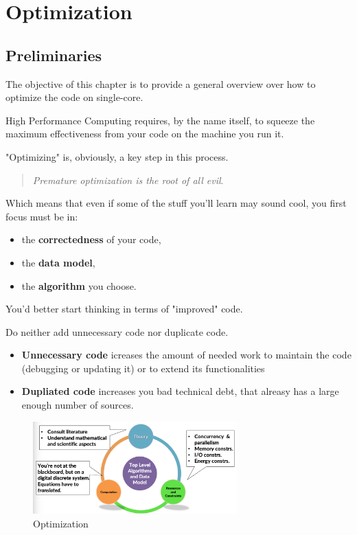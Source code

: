 
\chapter{Optimization}

\section{Preliminaries}

The objective of this chapter is to provide a general overview over how to optimize the code on single-core. 

High Performance Computing requires, by the name itself, to squeeze the
maximum effectiveness from your code on the machine you run it.

"Optimizing" is, obviously, a key step in this process.

\begin{observationblock}[Optimization]
    \vspace{0.3cm}
    \begin{quote}
    \textit{Premature optimization is the root of all evil}.
    \end{quote}
    \vspace{0.3cm}
    Which means that even if some of the stuff you'll learn may sound cool, you first focus must be in:
    \begin{itemize}
        \item the \textbf{correctedness} of your code,
        \item the \textbf{data model},
        \item the \textbf{algorithm} you choose.
    \end{itemize}

    You'd better start thinking in terms of "improved" code. 
\end{observationblock}

Do neither add unnecessary code nor duplicate code. 
\begin{itemize}
    \item \textbf{Unnecessary code} icreases the amount of needed work to maintain the code (debugging or updating it) or to extend its functionalities
    \item \textbf{Dupliated code} increases you bad technical debt, that alreasy has a large enough number of sources.
\end{itemize}

\begin{figure}[H]
    \centering
    \includegraphics[width=0.7\textwidth]{assets/opt1.png}
    \caption{Optimization}
\end{figure}

